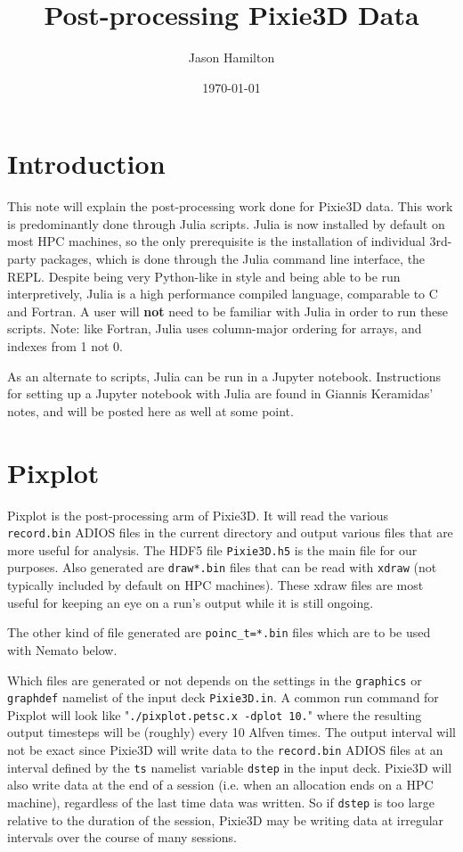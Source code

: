 \documentclass[12pt]{article}
\begin{document}
\title{Post-processing Pixie3D Data}
\author{Jason Hamilton}
\date{\today}

\maketitle

\section*{Introduction}
This note will explain the post-processing work done for Pixie3D data.
This work is predominantly done through Julia scripts.
Julia is now installed by default on most HPC machines, so the only prerequisite is the installation of individual 3rd-party packages, which is done through the Julia command line interface, the REPL.
Despite being very Python-like in style and being able to be run interpretively, Julia is a high performance compiled language, comparable to C and Fortran.
A user will \textbf{not} need to be familiar with Julia in order to run these scripts.
Note: like Fortran, Julia uses column-major ordering for arrays, and indexes from 1 not 0.

As an alternate to scripts, Julia can be run in a Jupyter notebook.
Instructions for setting up a Jupyter notebook with Julia are found in Giannis Keramidas' notes, and will be posted here as well at some point.

\section*{Pixplot}
Pixplot is the post-processing arm of Pixie3D.
It will read the various \texttt{record.bin} ADIOS files in the current directory and output various files that are more useful for analysis.
The HDF5 file \texttt{Pixie3D.h5} is the main file for our purposes.
Also generated are \texttt{draw*.bin} files that can be read with \texttt{xdraw} (not typically included by default on HPC machines).
These xdraw files are most useful for keeping an eye on a run's output while it is still ongoing.

The other kind of file generated are \texttt{poinc\_t=*.bin} files which are to be used with Nemato below.

Which files are generated or not depends on the settings in the \texttt{graphics} or \texttt{graphdef} namelist of the input deck \texttt{Pixie3D.in}.
A common run command for Pixplot will look like "\texttt{./pixplot.petsc.x -dplot 10.}" where the resulting output timesteps will be (roughly) every 10 Alfven times.
The output interval will not be exact since Pixie3D will write data to the \texttt{record.bin} ADIOS files at an interval defined by the \texttt{ts} namelist variable \texttt{dstep} in the input deck.
Pixie3D will also write data at the end of a session (i.e. when an allocation ends on a HPC machine), regardless of the last time data was written.
So if \texttt{dstep} is too large relative to the duration of the session, Pixie3D may be writing data at irregular intervals over the course of many sessions.
  
\end{document}
